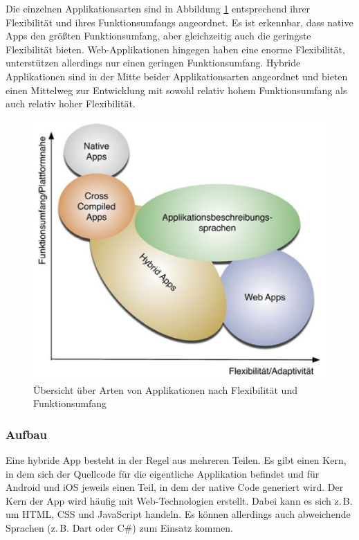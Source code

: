 \documentclass[]{lni}
\begin{document}
Die einzelnen Applikationsarten sind in Abbildung \ref{fig:appsFlexibilitaetFunktionsumfang} entsprechend ihrer Flexibilität und ihres Funktionsumfangs angeordnet. Es ist erkennbar, dass native Apps den größten Funktionsumfang, aber gleichzeitig auch die geringste Flexibilität bieten. Web-Applikationen hingegen haben eine enorme Flexibilität, unterstützen allerdings nur einen geringen Funktionsumfang. Hybride Applikationen sind in der Mitte beider Applikationsarten angeordnet und bieten einen Mittelweg zur Entwicklung mit sowohl relativ hohem Funktionsumfang als auch relativ hoher Flexibilität.

\begin{figure}[h]
	\centering
	\includegraphics[width=0.8\linewidth]{images/apps_flexibilitaet_funktionsumfang.png}
	\caption{Übersicht über Arten von Applikationen nach Flexibilität und Funktionsumfang \cite[S.405]{Willnecker.2012}}
	\label{fig:appsFlexibilitaetFunktionsumfang}
\end{figure}


\subsubsection*{Aufbau}
Eine hybride App besteht in der Regel aus mehreren Teilen. Es gibt einen Kern, in dem sich der Quellcode für die eigentliche Applikation befindet und für Android und iOS jeweils einen Teil, in dem der native Code generiert wird. Der Kern der App wird häufig mit Web-Technologien erstellt. Dabei kann es sich z.\,B. um HTML, CSS und JavaScript handeln. Es können allerdings auch abweichende Sprachen (z.\,B. Dart oder C\#) zum Einsatz kommen.
\end{document}
